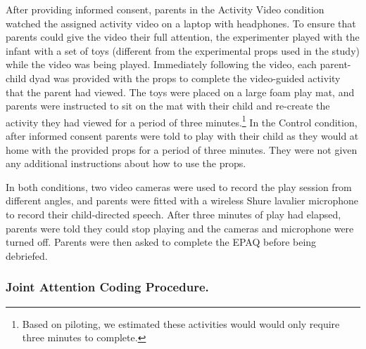 \documentclass[man,floatsintext]{apa6}
\let\rmarkdownfootnote\footnote%
\def\footnote{\protect\rmarkdownfootnote}
\begin{document}
After providing informed consent, parents in the Activity Video condition watched the assigned activity video on a laptop with headphones.
To ensure that parents could give the video their full attention, the experimenter played with the infant with a set of toys (different from the experimental props used in the study) while the video was being played.
Immediately following the video, each parent-child dyad was provided with the props to complete the video-guided activity that the parent had viewed.
The toys were placed on a large foam play mat, and parents were instructed to sit on the mat with their child and re-create the activity they had viewed for a period of three minutes.\footnote{Based on piloting, we estimated these activities would would only require three minutes to complete.}
In the Control condition, after informed consent parents were told to play with their child as they would at home with the provided props for a period of three minutes.
They were not given any additional instructions about how to use the props.

In both conditions, two video cameras were used to record the play session from different angles, and parents were fitted with a wireless Shure lavalier microphone to record their child-directed speech.
After three minutes of play had elapsed, parents were told they could stop playing and the cameras and microphone were turned off.
Parents were then asked to complete the EPAQ before being debriefed.

\hypertarget{joint-attention-coding-procedure.}{%
\subsubsection{Joint Attention Coding Procedure.}\label{joint-attention-coding-procedure.}}
\end{document}
